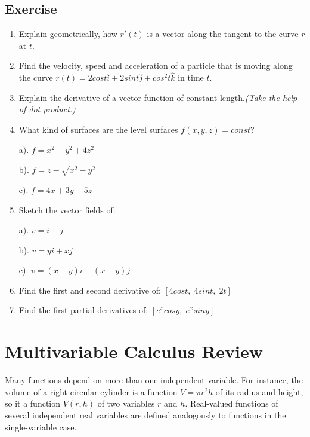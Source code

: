 \documentclass[aima331_lecturenotes_ku.tex]{subfiles}
\begin{document}
\subsection{Exercise}
\begin{enumerate}
\item Explain geometrically, how $r'(t)$ is a vector along the tangent to the curve $r$ at $t$.

\item   Find the velocity, speed and acceleration of a particle that is moving along the curve $r(t) = 2 cost\hat{i} + 2sint \hat{j} + cos^2t \hat{k}$ in time $t$.
\item Explain the derivative of a vector function of constant length.\textit{(Take the help of dot product.)}
\item What kind of surfaces are the level surfaces $f(x,y,z)=const$?
  \begin{multicols}{3}
    a). $f=x^2+y^2+4z^2$
    \columnbreak

    b). $f=z-\sqrt{x^2-y^2}$
    \columnbreak

    c). $f=4x+3y-5z$
  \end{multicols}
\item Sketch the vector fields of:
  \begin{multicols}{3}
    a). $v=i-j$
    \columnbreak

    b). $v=yi+xj$
    \columnbreak

    c). $v=(x-y)i + (x+y)j$
  \end{multicols}

\item Find the first and second derivative of: $[4cost,\; 4sint, \; 2t]$
\item Find the first partial derivatives of: $[e^xcosy,\; e^xsiny]$
\end{enumerate}

\section{Multivariable Calculus Review}
Many functions depend on more than one independent variable. For instance, the volume of a right circular cylinder is a function \(V=\pi r^2 h\) of its radius and height, so it a function \(V(r,h)\) of two variables \(r\) and \(h\). Real-valued functions of several independent real variables  are defined analogously to functions in the single-variable case.
\end{document}
